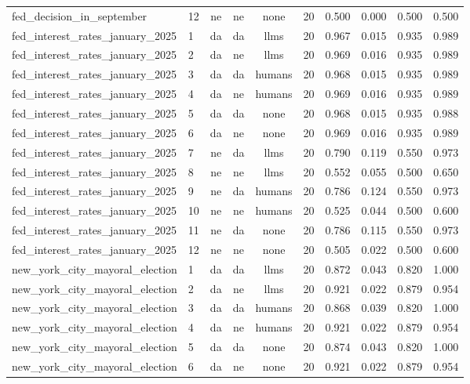 \begin{longtable}{llccclrrrr}
fed\_decision\_in\_september & 12 & ne & ne & none & 20 & 0.500 & 0.000 & 0.500 & 0.500 \\
fed\_interest\_rates\_january\_2025 & 1 & da & da & llms & 20 & 0.967 & 0.015 & 0.935 & 0.989 \\
fed\_interest\_rates\_january\_2025 & 2 & da & ne & llms & 20 & 0.969 & 0.016 & 0.935 & 0.989 \\
fed\_interest\_rates\_january\_2025 & 3 & da & da & humans & 20 & 0.968 & 0.015 & 0.935 & 0.989 \\
fed\_interest\_rates\_january\_2025 & 4 & da & ne & humans & 20 & 0.969 & 0.016 & 0.935 & 0.989 \\
fed\_interest\_rates\_january\_2025 & 5 & da & da & none & 20 & 0.968 & 0.015 & 0.935 & 0.988 \\
fed\_interest\_rates\_january\_2025 & 6 & da & ne & none & 20 & 0.969 & 0.016 & 0.935 & 0.989 \\
fed\_interest\_rates\_january\_2025 & 7 & ne & da & llms & 20 & 0.790 & 0.119 & 0.550 & 0.973 \\
fed\_interest\_rates\_january\_2025 & 8 & ne & ne & llms & 20 & 0.552 & 0.055 & 0.500 & 0.650 \\
fed\_interest\_rates\_january\_2025 & 9 & ne & da & humans & 20 & 0.786 & 0.124 & 0.550 & 0.973 \\
fed\_interest\_rates\_january\_2025 & 10 & ne & ne & humans & 20 & 0.525 & 0.044 & 0.500 & 0.600 \\
fed\_interest\_rates\_january\_2025 & 11 & ne & da & none & 20 & 0.786 & 0.115 & 0.550 & 0.973 \\
fed\_interest\_rates\_january\_2025 & 12 & ne & ne & none & 20 & 0.505 & 0.022 & 0.500 & 0.600 \\
new\_york\_city\_mayoral\_election & 1 & da & da & llms & 20 & 0.872 & 0.043 & 0.820 & 1.000 \\
new\_york\_city\_mayoral\_election & 2 & da & ne & llms & 20 & 0.921 & 0.022 & 0.879 & 0.954 \\
new\_york\_city\_mayoral\_election & 3 & da & da & humans & 20 & 0.868 & 0.039 & 0.820 & 1.000 \\
new\_york\_city\_mayoral\_election & 4 & da & ne & humans & 20 & 0.921 & 0.022 & 0.879 & 0.954 \\
new\_york\_city\_mayoral\_election & 5 & da & da & none & 20 & 0.874 & 0.043 & 0.820 & 1.000 \\
new\_york\_city\_mayoral\_election & 6 & da & ne & none & 20 & 0.921 & 0.022 & 0.879 & 0.954 \\

\end{longtable}
